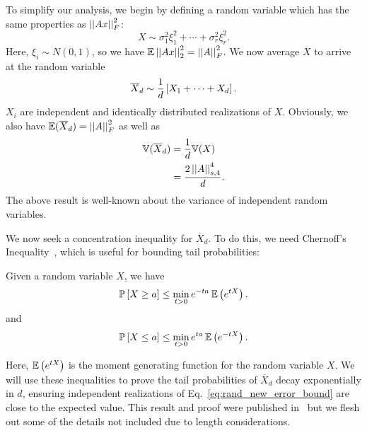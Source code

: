 To simplify our analysis, we begin by defining a random variable
which has the same properties as $\left| \left| Ax \right| \right|_{F}^{2}$:
%
\begin{equation}
    X \sim \sigma_{1}^{2}\xi_{1}^{2} + \cdots + \sigma_{r}^{2}\xi_{r}^{2}.
\end{equation}
%
Here, $\xi_{i}\sim N(0,1)$,
so we have $\mathbb{E}\left| \left| Ax \right| \right|_{2}^{2} = \left| \left| A \right| \right|_{F}^{2}$.
We now average $X$ to arrive at the random variable
%
\begin{equation}
    \overline{X}_{d} \sim \frac{1}{d}\left[ X_{1} + \cdots + X_{d} \right].
    \label{eq:rand_averaged_RV}
\end{equation}
%
$X_{i}$ are independent and identically distributed realizations of $X$.
Obviously, we also have $\mathbb{E}(\overline{X}_{d}) = \left| \left| A \right| \right|_{F}^{2}$ as well as
%
\begin{align}
    \mathbb{V}(\overline{X}_{d}) &= \frac{1}{d}\mathbb{V}(X) \nonumber\\
        &= \frac{2\left| \left| A \right| \right|_{s,4}^{4}}{d}.
    \label{eq:rand_Xd_variance_bounds}
\end{align}
%
The above result is well-known about the variance of independent random
variables.

We now seek a concentration inequality
for $\overline{X}_{d}$.
To do this, we need Chernoff's Inequality~\cite{prob_book},
which is useful for bounding tail probabilities:

\begin{thm}\label{thm:Chernoff}
Given a random variable $X$, we have
%
\begin{equation}
    \mathbb{P}\left[ X \ge a \right] \le \min_{t > 0} e^{-ta}\, \mathbb{E}\left( e^{tX} \right).
    \label{eq:Chernoff}
\end{equation}
%
and
%
\begin{equation}
    \mathbb{P}\left[ X \le a \right] \le \min_{t>0} e^{ta}\,\mathbb{E}\left( e^{-tX} \right).
\end{equation}
\end{thm}

\noindent
Here, $\mathbb{E}\left( e^{tX} \right)$ is the moment generating function
for the random variable $X$.
We will use these inequalities to prove the tail probabilities
of $\overline{X}_{d}$ decay exponentially in $d$,
ensuring independent realizations of
Eq.~\eqref{eq:rand_new_error_bound} are close to the expected value.
This result and proof were published
in~\cite{randomHSSLBL} but we flesh out some of the details not
included due to length considerations.



